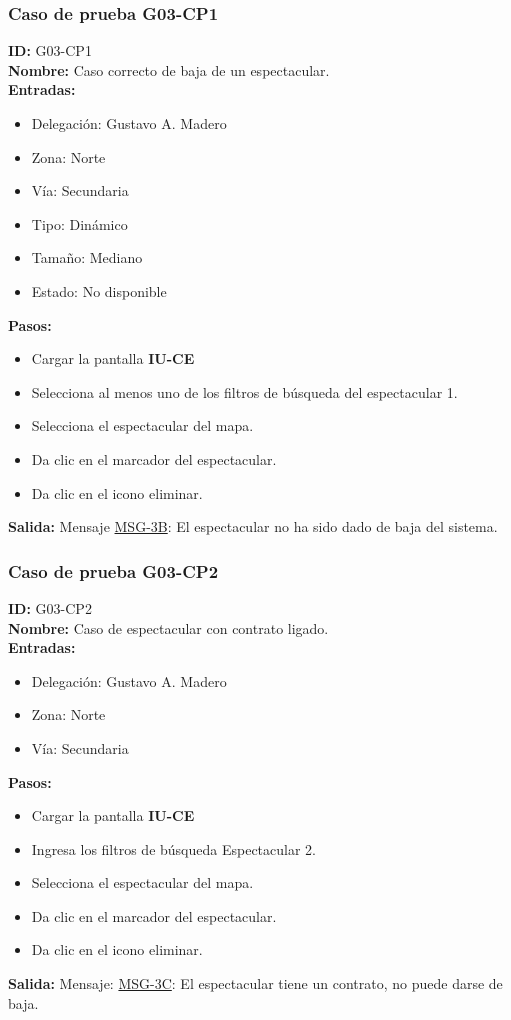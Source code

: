 \subsubsection{Caso de prueba G03-CP1}
\textbf{ID:} G03-CP1\\
\textbf{Nombre:} Caso correcto de baja de un espectacular.\\
\textbf{Entradas:} 
\begin{itemize}
    \item Delegación: Gustavo A. Madero
    \item Zona: Norte
    \item Vía: Secundaria
    \item Tipo: Dinámico 
    \item Tamaño: Mediano
    \item Estado: No disponible
\end{itemize}
\textbf{Pasos:}
\begin{itemize}
    \item Cargar la pantalla \textbf{IU-CE}
    \item Selecciona al menos uno de los filtros de búsqueda del espectacular 1.
    \item Selecciona el espectacular del mapa. 
    \item Da clic en el marcador del espectacular.
    \item Da clic en el icono eliminar.
\end{itemize}
\textbf{Salida:}
Mensaje \hyperlink{MSG-3B}{MSG-3B}: El espectacular no ha sido dado de baja del sistema.

\subsubsection{Caso de prueba G03-CP2}
\textbf{ID:} G03-CP2\\
\textbf{Nombre:} Caso de espectacular con contrato ligado.\\
\textbf{Entradas:} 
\begin{itemize}
    \item Delegación: Gustavo A. Madero
    \item Zona: Norte
    \item Vía: Secundaria
\end{itemize}
\textbf{Pasos:}\\
\begin{itemize}
    \item Cargar la pantalla \textbf{IU-CE}
    \item Ingresa los filtros de búsqueda Espectacular 2.
    \item Selecciona el espectacular del mapa. 
    \item Da clic en el marcador del espectacular.
    \item Da clic en el icono eliminar.
\end{itemize}
\textbf{Salida:}
Mensaje: \hyperlink{MSG-3C}{MSG-3C}: El espectacular tiene un contrato, no puede darse de baja.
\clearpage


